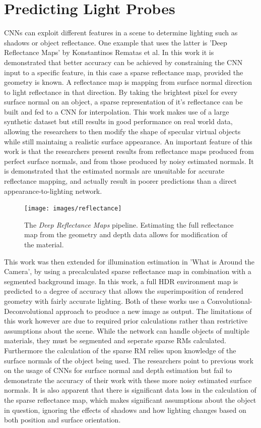 \documentclass[ %
                    author={Gavin Parker},
                supervisor={Dr. Neill Campbell},
                    degree={MEng},
                     title={Deep Siamese Networks for Illumination Estimation from Stereo Images},
                  subtitle={},
                      type={research},
                      year={2018} ]{dissertation}
\begin{document}
\section{Predicting Light Probes}
CNNs can exploit different features in a scene to determine lighting such as shadows or object reflectance. One example that uses the latter is 'Deep Reflectance Maps' \cite{RematasCVPR2016} by Konstantinos Rematas et al. In this work it is demonstrated that better accuracy can be achieved by constraining the CNN input to a specific feature, in this case a sparse reflectance map, provided the geometry is known. A reflectance map is mapping from surface normal direction to light reflectance in that direction. By taking the brightest pixel for every surface normal on an object, a sparse representation of it's reflectance can be built and fed to a CNN for interpolation. This work makes use of a large synthetic dataset but still results in good performance on real world data, allowing the researchers to then modify the shape of specular virtual objects while still maintaing a realistic surface appearance. An important feature of this work is that the researchers present results from reflectance maps produced from perfect surface normals, and from those produced by noisy estimated normals. It is demonstrated that the estimated normals are unsuitable for accurate reflectance mapping, and actually result in poorer predictions than a direct appearance-to-lighting network.
\begin{figure}[H]
\texttt{[image: images/reflectance]}
\centering
\caption{The \textit{Deep Reflectance Maps} pipeline. Estimating the full reflectance map from the geometry and depth data allows for modification of the material.}
\end{figure}
This work was then extended for illumination estimation in 'What is Around the Camera', by using a precalculated sparse reflectance map in combination with a segmented background image. In this work, a full HDR environment map is predicted to a degree of accuracy that allows the superimposition of rendered geometry with fairly accurate lighting. Both of these works use a Convolutional-Deconvolutional approach to produce a new image as output. The limitations of this work however are due to required prior calculations rather than restrictive assumptions about the scene. While the network can handle objects of multiple materials, they must be segmented and seperate sparse RMs calculated. Furthermore the calculation of the sparse RM relies upon knowledge of the surface normals of the object being used. The researchers point to previous work  on the usage of CNNs for surface normal and depth estimation but fail to demonstrate the accuracy of their work with these more noisy estimated surface normals. It is also apparent that there is significant data loss in the calculation of the sparse reflectance map, which makes significant assumptions about the object in question, ignoring the effects of shadows and how lighting changes based on both position and surface orientation.
\end{document}
